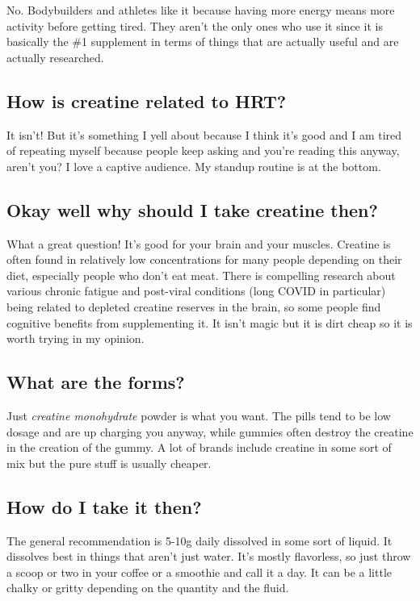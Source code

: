 \documentclass{article}
\begin{document}
No. Bodybuilders and athletes like it because having more energy means more activity before getting tired. They aren’t the only ones who use it since it is basically the \#1 supplement in terms of things that are actually useful and are actually researched. 

\subsection{How is creatine related to HRT?}

It isn’t! But it’s something I yell about because I think it’s good and I am tired of repeating myself because people keep asking and you’re reading this anyway, aren’t you? I love a captive audience. My standup routine is at the bottom.

\subsection{Okay well why should I take creatine then?}

What a great question! It’s good for your brain and your muscles. Creatine is often found in relatively low concentrations for many people depending on their diet, especially people who don’t eat meat. There is compelling research about various chronic fatigue and post-viral conditions (long COVID in particular) being related to depleted creatine reserves in the brain, so some people find cognitive benefits from supplementing it. It isn’t magic but it is dirt cheap so it is worth trying in my opinion.

\subsection{What are the forms?}

Just \textit{creatine monohydrate} powder is what you want. The pills tend to be low dosage and are up charging you anyway, while gummies often destroy the creatine in the creation of the gummy. A lot of brands include creatine in some sort of mix but the pure stuff is usually cheaper.

\subsection{How do I take it then?}

The general recommendation is 5-10g daily dissolved in some sort of liquid. It dissolves best in things that aren’t just water. It’s mostly flavorless, so just throw a scoop or two in your coffee or a smoothie and call it a day. It can be a little chalky or gritty depending on the quantity and the fluid.
\end{document}
